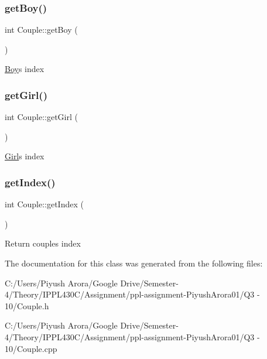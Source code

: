 \subsubsection{\texorpdfstring{get\+Boy()}{getBoy()}}
{\footnotesize\ttfamily int Couple\+::get\+Boy (\begin{DoxyParamCaption}{ }\end{DoxyParamCaption})}

\hyperlink{class_boy}{Boy}\textquotesingle{}s index \mbox{\label{class_couple_a102761f3b3c46949a97829d518bfb0fe}} 
\subsubsection{\texorpdfstring{get\+Girl()}{getGirl()}}
{\footnotesize\ttfamily int Couple\+::get\+Girl (\begin{DoxyParamCaption}{ }\end{DoxyParamCaption})}

\hyperlink{class_girl}{Girl}\textquotesingle{}s index \mbox{\label{class_couple_adde1121effca72c7eb13f258c9caff47}} 
\subsubsection{\texorpdfstring{get\+Index()}{getIndex()}}
{\footnotesize\ttfamily int Couple\+::get\+Index (\begin{DoxyParamCaption}{ }\end{DoxyParamCaption})}

Return couple\textquotesingle{}s index 

The documentation for this class was generated from the following files\+:\begin{DoxyCompactItemize}
\item 
C\+:/\+Users/\+Piyush Arora/\+Google Drive/\+Semester-\/4/\+Theory/\+I\+P\+P\+L430\+C/\+Assignment/ppl-\/assignment-\/\+Piyush\+Arora01/\+Q3 -\/ 10/Couple.\+h\item 
C\+:/\+Users/\+Piyush Arora/\+Google Drive/\+Semester-\/4/\+Theory/\+I\+P\+P\+L430\+C/\+Assignment/ppl-\/assignment-\/\+Piyush\+Arora01/\+Q3 -\/ 10/Couple.\+cpp\end{DoxyCompactItemize}
